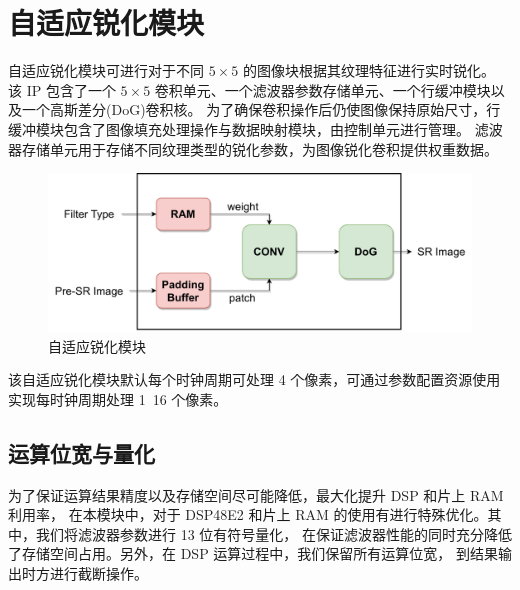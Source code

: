 \documentclass[12pt, a4paper, oneside]{ctexbook}
\begin{document}
	\chapter{自适应锐化模块}
	自适应锐化模块可进行对于不同 $5\times5$ 的图像块根据其纹理特征进行实时锐化。
	该 IP 包含了一个 $5\times5$ 卷积单元、一个滤波器参数存储单元、一个行缓冲模块以及一个高斯差分(DoG)卷积核。
	为了确保卷积操作后仍使图像保持原始尺寸，行缓冲模块包含了图像填充处理操作与数据映射模块，由控制单元进行管理。
	滤波器存储单元用于存储不同纹理类型的锐化参数，为图像锐化卷积提供权重数据。
		\begin{figure}[h]
		\centering
		\includegraphics[scale=0.80]{pic/sharpener.drawio.pdf}
		\caption{自适应锐化模块}
		\end{figure}	
	\par 该自适应锐化模块默认每个时钟周期可处理 4 个像素，可通过参数配置资源使用实现每时钟周期处理 1~16 个像素。
	\section{运算位宽与量化}
	为了保证运算结果精度以及存储空间尽可能降低，最大化提升 DSP 和片上 RAM 利用率，
	在本模块中，对于 DSP48E2 和片上 RAM 的使用有进行特殊优化。其中，我们将滤波器参数进行 13 位有符号量化，
	在保证滤波器性能的同时充分降低了存储空间占用。另外，在 DSP 运算过程中，我们保留所有运算位宽，
	到结果输出时方进行截断操作。
\end{document}
